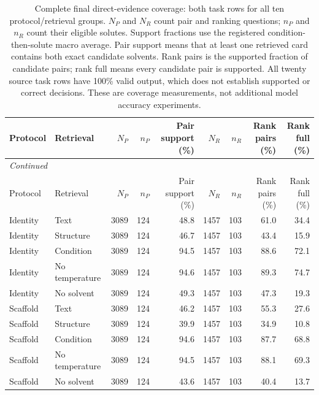 \begingroup\footnotesize
\setlength{\tabcolsep}{3pt}
\begin{longtable}{llrrrrrrr}
\caption{Complete final direct-evidence coverage: both task rows for all ten protocol/retrieval groups. $N_P$ and $N_R$ count pair and ranking questions; $n_P$ and $n_R$ count their eligible solutes. Support fractions use the registered condition-then-solute macro average. Pair support means that at least one retrieved card contains both exact candidate solvents. Rank pairs is the supported fraction of candidate pairs; rank full means every candidate pair is supported. All twenty source task rows have 100\% valid output, which does not establish supported or correct decisions. These are coverage measurements, not additional model accuracy experiments.}\label{tab:evidence-support}\\
\toprule
Protocol & Retrieval & $N_P$ & $n_P$ & \shortstack{Pair support\\(\%)} & $N_R$ & $n_R$ & \shortstack{Rank pairs\\(\%)} & \shortstack{Rank full\\(\%)} \\
\midrule
\endfirsthead
\multicolumn{9}{l}{\textit{Continued}} \\
\toprule
Protocol & Retrieval & $N_P$ & $n_P$ & \shortstack{Pair support\\(\%)} & $N_R$ & $n_R$ & \shortstack{Rank pairs\\(\%)} & \shortstack{Rank full\\(\%)} \\
\midrule
\endhead
Identity & Text & 3089 & 124 & 48.8 & 1457 & 103 & 61.0 & 34.4 \\
Identity & Structure & 3089 & 124 & 46.7 & 1457 & 103 & 43.4 & 15.9 \\
Identity & Condition & 3089 & 124 & 94.5 & 1457 & 103 & 88.6 & 72.1 \\
Identity & No temperature & 3089 & 124 & 94.6 & 1457 & 103 & 89.3 & 74.7 \\
Identity & No solvent & 3089 & 124 & 49.3 & 1457 & 103 & 47.3 & 19.3 \\
Scaffold & Text & 3089 & 124 & 46.2 & 1457 & 103 & 55.3 & 27.6 \\
Scaffold & Structure & 3089 & 124 & 39.9 & 1457 & 103 & 34.9 & 10.8 \\
Scaffold & Condition & 3089 & 124 & 94.6 & 1457 & 103 & 87.7 & 68.8 \\
Scaffold & No temperature & 3089 & 124 & 94.5 & 1457 & 103 & 88.1 & 69.3 \\
Scaffold & No solvent & 3089 & 124 & 43.6 & 1457 & 103 & 40.4 & 13.7 \\
\bottomrule
\end{longtable}
\endgroup
